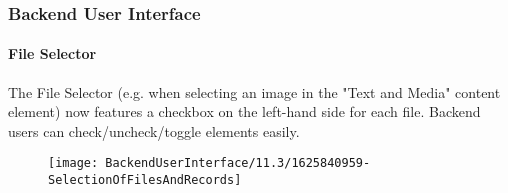%

\begin{frame}[fragile]
	\frametitle{Backend User Interface}
	\framesubtitle{File Selector}

	The File Selector (e.g. when selecting an image in the "Text and Media" content
	element) now features a checkbox on the left-hand side for each file. Backend
	users can check/uncheck/toggle elements easily.

	\begin{figure}
		\texttt{[image: BackendUserInterface/11.3/1625840959-SelectionOfFilesAndRecords]}
	\end{figure}

\end{frame}

